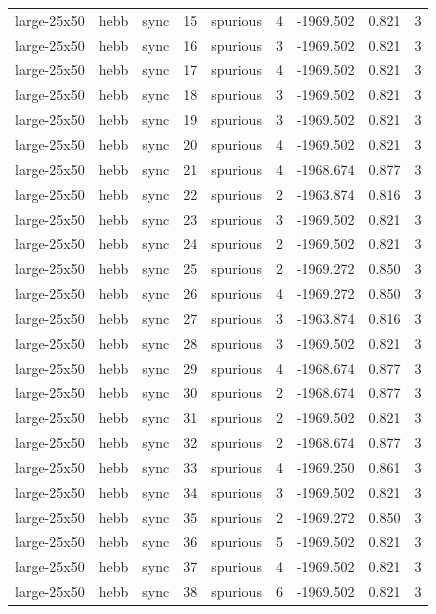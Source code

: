 \begin{tabular}{lllrlrrrr}
large-25x50 & hebb & sync & 15 & spurious & 4 & -1969.502 & 0.821 & 3 \\
large-25x50 & hebb & sync & 16 & spurious & 3 & -1969.502 & 0.821 & 3 \\
large-25x50 & hebb & sync & 17 & spurious & 4 & -1969.502 & 0.821 & 3 \\
large-25x50 & hebb & sync & 18 & spurious & 3 & -1969.502 & 0.821 & 3 \\
large-25x50 & hebb & sync & 19 & spurious & 3 & -1969.502 & 0.821 & 3 \\
large-25x50 & hebb & sync & 20 & spurious & 4 & -1969.502 & 0.821 & 3 \\
large-25x50 & hebb & sync & 21 & spurious & 4 & -1968.674 & 0.877 & 3 \\
large-25x50 & hebb & sync & 22 & spurious & 2 & -1963.874 & 0.816 & 3 \\
large-25x50 & hebb & sync & 23 & spurious & 3 & -1969.502 & 0.821 & 3 \\
large-25x50 & hebb & sync & 24 & spurious & 2 & -1969.502 & 0.821 & 3 \\
large-25x50 & hebb & sync & 25 & spurious & 2 & -1969.272 & 0.850 & 3 \\
large-25x50 & hebb & sync & 26 & spurious & 4 & -1969.272 & 0.850 & 3 \\
large-25x50 & hebb & sync & 27 & spurious & 3 & -1963.874 & 0.816 & 3 \\
large-25x50 & hebb & sync & 28 & spurious & 3 & -1969.502 & 0.821 & 3 \\
large-25x50 & hebb & sync & 29 & spurious & 4 & -1968.674 & 0.877 & 3 \\
large-25x50 & hebb & sync & 30 & spurious & 2 & -1968.674 & 0.877 & 3 \\
large-25x50 & hebb & sync & 31 & spurious & 2 & -1969.502 & 0.821 & 3 \\
large-25x50 & hebb & sync & 32 & spurious & 2 & -1968.674 & 0.877 & 3 \\
large-25x50 & hebb & sync & 33 & spurious & 4 & -1969.250 & 0.861 & 3 \\
large-25x50 & hebb & sync & 34 & spurious & 3 & -1969.502 & 0.821 & 3 \\
large-25x50 & hebb & sync & 35 & spurious & 2 & -1969.272 & 0.850 & 3 \\
large-25x50 & hebb & sync & 36 & spurious & 5 & -1969.502 & 0.821 & 3 \\
large-25x50 & hebb & sync & 37 & spurious & 4 & -1969.502 & 0.821 & 3 \\
large-25x50 & hebb & sync & 38 & spurious & 6 & -1969.502 & 0.821 & 3 \\

\end{tabular}
